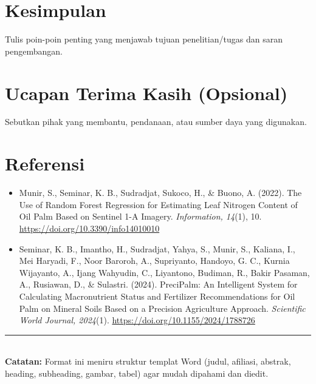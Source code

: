 \documentclass[11pt,a4paper]{article}
\begin{document}
\section{Kesimpulan}
Tulis poin-poin penting yang menjawab tujuan penelitian/tugas dan saran pengembangan.

\section*{Ucapan Terima Kasih (Opsional)}
Sebutkan pihak yang membantu, pendanaan, atau sumber daya yang digunakan.

\section*{Referensi}
\begin{itemize}[leftmargin=*, itemsep=2pt]
  \item Munir, S., Seminar, K. B., Sudradjat, Sukoco, H., \& Buono, A. (2022). The Use of Random Forest Regression for Estimating Leaf Nitrogen Content of Oil Palm Based on Sentinel 1-A Imagery. \textit{Information, 14}(1), 10. \url{https://doi.org/10.3390/info14010010}
  \item Seminar, K. B., Imantho, H., Sudradjat, Yahya, S., Munir, S., Kaliana, I., Mei Haryadi, F., Noor Baroroh, A., Supriyanto, Handoyo, G. C., Kurnia Wijayanto, A., Ijang Wahyudin, C., Liyantono, Budiman, R., Bakir Pasaman, A., Rusiawan, D., \& Sulastri. (2024). PreciPalm: An Intelligent System for Calculating Macronutrient Status and Fertilizer Recommendations for Oil Palm on Mineral Soils Based on a Precision Agriculture Approach. \textit{Scientific World Journal, 2024}(1). \url{https://doi.org/10.1155/2024/1788726}
\end{itemize}

\vfill
\noindent\rule{\linewidth}{0.4pt}\\
\small \textbf{Catatan:} Format ini meniru struktur templat Word (judul, afiliasi, abstrak, heading, subheading, gambar, tabel) agar mudah dipahami dan diedit.
\end{document}
